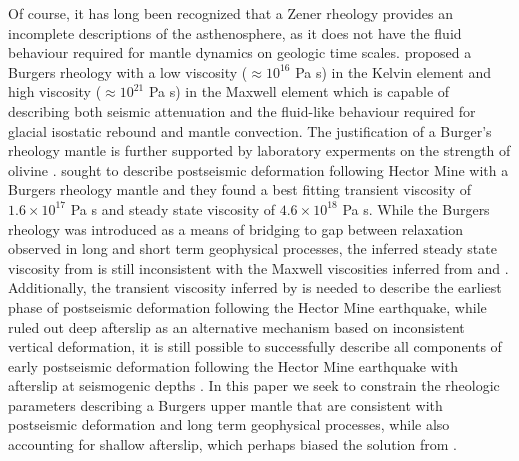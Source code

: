 \documentclass[12pt]{article}
\begin{document}
Of course, it has long been recognized that a Zener rheology provides an incomplete descriptions of the asthenosphere, as it does not have the fluid behaviour required for mantle dynamics on geologic time scales. \cite{Yuen1982} proposed a Burgers rheology with a low viscosity ($\approx 10^{16}$ Pa s) in the Kelvin element and high viscosity ($\approx 10^{21}$ Pa s) in the Maxwell element which is capable of describing both seismic attenuation and the fluid-like behaviour required for glacial isostatic rebound and mantle convection. The justification of a Burger's rheology mantle is further supported by laboratory experments on the strength of olivine \cite{Chopra1997}. \cite{Pollitz2003} sought to describe postseismic deformation following Hector Mine with a Burgers rheology mantle and they found a best fitting transient viscosity of $1.6\times10^{17}$ Pa s and steady state viscosity of $4.6\times10^{18}$ Pa s. While the Burgers rheology was introduced as a means of bridging to gap between relaxation observed in long and short term geophysical processes, the inferred steady state viscosity from \cite{Pollitz2003} is still inconsistent with the Maxwell viscosities inferred from \cite{Lundgren2009} and \cite{Luttrell2007}. Additionally, the transient viscosity inferred by \cite{Pollitz2003} is needed to describe the earliest phase of postseismic deformation following the Hector Mine earthquake, while \cite{Pollitz2003} ruled out deep afterslip as an alternative mechanism based on inconsistent vertical deformation, it is still possible to successfully describe all components of early postseismic deformation following the Hector Mine earthquake with afterslip at seismogenic depths \cite{Jacobs2002}. In this paper we seek to constrain the rheologic parameters describing a Burgers upper mantle that are consistent with postseismic deformation and long term geophysical processes, while also accounting  for shallow afterslip, which perhaps biased the solution from \cite{Pollitz2003}.
\end{document}
